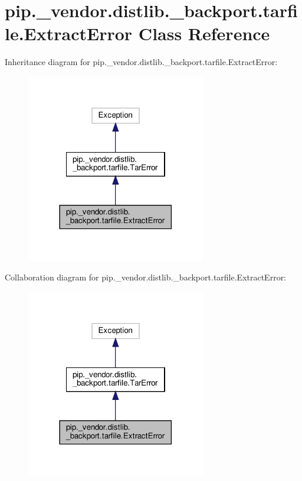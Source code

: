 \hypertarget{classpip_1_1__vendor_1_1distlib_1_1__backport_1_1tarfile_1_1ExtractError}{}\section{pip.\+\_\+vendor.\+distlib.\+\_\+backport.\+tarfile.\+Extract\+Error Class Reference}
\label{classpip_1_1__vendor_1_1distlib_1_1__backport_1_1tarfile_1_1ExtractError}


Inheritance diagram for pip.\+\_\+vendor.\+distlib.\+\_\+backport.\+tarfile.\+Extract\+Error\+:
\nopagebreak
\begin{figure}[H]
\begin{center}
\leavevmode
\includegraphics[width=222pt]{classpip_1_1__vendor_1_1distlib_1_1__backport_1_1tarfile_1_1ExtractError__inherit__graph}
\end{center}
\end{figure}


Collaboration diagram for pip.\+\_\+vendor.\+distlib.\+\_\+backport.\+tarfile.\+Extract\+Error\+:
\nopagebreak
\begin{figure}[H]
\begin{center}
\leavevmode
\includegraphics[width=222pt]{classpip_1_1__vendor_1_1distlib_1_1__backport_1_1tarfile_1_1ExtractError__coll__graph}
\end{center}
\end{figure}


